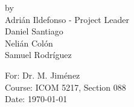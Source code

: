 \begin{titlepage}
\begin{center}
by \\[0.5cm]

Adri\'{a}n Ildefonso - Project Leader \\
Daniel Santiago \\
Neli\'{a}n Col\'{o}n \\
Samuel Rodr\'{i}guez \\

\vfill

For: Dr. M. Jim\'{e}nez \\
Course: ICOM 5217, Section 088 \\
Date: \today






\end{center}

\end{titlepage}
